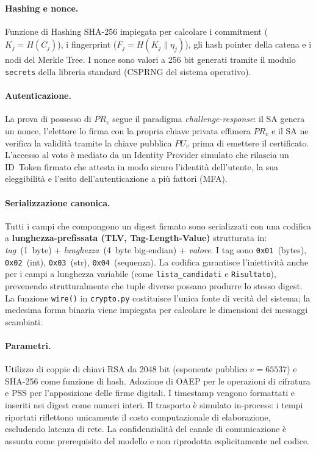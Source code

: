 \paragraph{Hashing e nonce.} Funzione di Hashing SHA-256 impiegata per calcolare i commitment ($K_j = H(C_j)$), i
fingerprint ($F_j = H(K_j \| \eta_j)$), gli hash pointer della catena e i nodi
del Merkle Tree. I nonce sono valori a 256 bit generati tramite il modulo \texttt{secrets} della
libreria standard (CSPRNG del sistema operativo).

\paragraph{Autenticazione.} La prova di possesso di $PR_v$ segue il paradigma
\emph{challenge-response}: il SA genera un nonce, l'elettore lo firma con la propria chiave privata effimera $PR_v$ e
il SA ne verifica la validità tramite la chiave pubblica $PU_v$ prima di emettere il certificato. L'accesso al
voto è mediato da un Identity Provider simulato che rilascia un ID~Token firmato che attesta in modo sicuro l'identità dell'utente, la sua eleggibilità e l'esito dell'autenticazione a più fattori (MFA).

\paragraph{Serializzazione canonica.} Tutti i campi che compongono un digest
firmato sono serializzati con una codifica a \textbf{lunghezza-prefissata (TLV,
Tag-Length-Value)} strutturata in: \emph{tag}~(1~byte) + \emph{lunghezza}~(4~byte big-endian) +
\emph{valore}. I tag sono \texttt{0x01}~(bytes), \texttt{0x02}~(int),
\texttt{0x03}~(str), \texttt{0x04}~(sequenza). La codifica garantisce l'iniettività anche per i
campi a lunghezza variabile (come \texttt{lista\_candidati} e \texttt{Risultato}),
prevenendo strutturalmente che tuple diverse possano produrre lo stesso digest. La funzione
\texttt{wire()} in \texttt{crypto.py} costituisce l'unica fonte di verità del sistema; la medesima forma binaria viene impiegata per calcolare le dimensioni dei messaggi scambiati.

\paragraph{Parametri.} Utilizzo di coppie di chiavi RSA da 2048 bit (esponente pubblico $e = 65537$) e SHA-256 come funzione di hash. Adozione di OAEP per le operazioni di cifratura e PSS per l'apposizione delle firme digitali. I timestamp vengono formattati e inseriti nei digest come numeri interi. Il trasporto è simulato in-process: i tempi riportati riflettono unicamente il costo computazionale di elaborazione, escludendo latenza di rete. La confidenzialità del canale di comunicazione è assunta come prerequisito del modello e non riprodotta esplicitamente nel codice.


